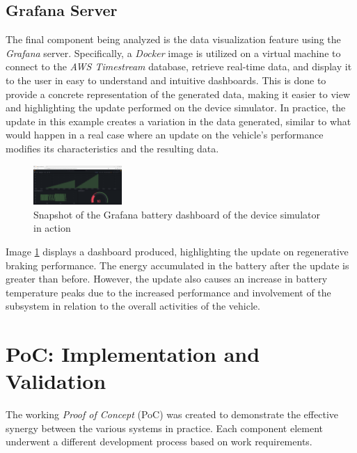 \documentclass[10pt,a4paper,roman, twocolumn]{article}
\begin{document}
\subsection{Grafana Server}
The final component being analyzed is the data visualization feature using the \textit{Grafana} server. Specifically, a \textit{Docker} image is utilized on a virtual machine to connect to the \textit{AWS Timestream} database, retrieve real-time data, and display it to the user in easy to understand and intuitive dashboards.
This is done to provide a concrete representation of the generated data, making it easier to view and highlighting the update performed on the device simulator. In practice, the update in this example creates a variation in the data generated, similar to what would happen in a real case where an update on the vehicle's performance modifies its characteristics and the resulting data.
\begin{figure} [tbh]
	\centerline{\includegraphics[width=0.3\textwidth]{images/grafana_Battery.png}}
	\caption{Snapshot of the Grafana battery dashboard of the device simulator in action}
	\label{fig:GrafanaBattery}
\end{figure}

Image \ref{fig:GrafanaBattery} displays a dashboard produced, highlighting the update on regenerative braking performance. The energy accumulated in the battery after the update is greater than before. However, the update also causes an increase in battery temperature peaks due to the increased performance and involvement of the subsystem in relation to the overall activities of the vehicle.

\section{PoC: Implementation and Validation}
The working \textit{Proof of Concept} (PoC) was created to demonstrate the effective synergy between the various systems in practice. Each component element underwent a different development process based on work requirements.
\end{document}
